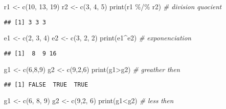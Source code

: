 \documentclass[
]{article}
\newenvironment{Shaded}{\begin{snugshade}}{\end{snugshade}}
\newcommand{\CommentTok}[1]{\textcolor[rgb]{0.56,0.35,0.01}{\textit{#1}}}
\newcommand{\DecValTok}[1]{\textcolor[rgb]{0.00,0.00,0.81}{#1}}
\newcommand{\FunctionTok}[1]{\textcolor[rgb]{0.00,0.00,0.00}{#1}}
\newcommand{\NormalTok}[1]{#1}
\newcommand{\OtherTok}[1]{\textcolor[rgb]{0.56,0.35,0.01}{#1}}
\newcommand{\SpecialCharTok}[1]{\textcolor[rgb]{0.00,0.00,0.00}{#1}}
\begin{document}
\begin{Shaded}
\begin{Highlighting}[]
\NormalTok{r1 }\OtherTok{\textless{}{-}} \FunctionTok{c}\NormalTok{(}\DecValTok{10}\NormalTok{, }\DecValTok{13}\NormalTok{, }\DecValTok{19}\NormalTok{)}
\NormalTok{r2 }\OtherTok{\textless{}{-}} \FunctionTok{c}\NormalTok{(}\DecValTok{3}\NormalTok{, }\DecValTok{4}\NormalTok{, }\DecValTok{5}\NormalTok{)}
\FunctionTok{print}\NormalTok{(r1 }\SpecialCharTok{\%/\%}\NormalTok{ r2) }\CommentTok{\# division quocient}
\end{Highlighting}
\end{Shaded}

\begin{verbatim}
## [1] 3 3 3
\end{verbatim}

\begin{Shaded}
\begin{Highlighting}[]
\NormalTok{e1 }\OtherTok{\textless{}{-}} \FunctionTok{c}\NormalTok{(}\DecValTok{2}\NormalTok{, }\DecValTok{3}\NormalTok{, }\DecValTok{4}\NormalTok{)}
\NormalTok{e2 }\OtherTok{\textless{}{-}} \FunctionTok{c}\NormalTok{(}\DecValTok{3}\NormalTok{, }\DecValTok{2}\NormalTok{, }\DecValTok{2}\NormalTok{)}
\FunctionTok{print}\NormalTok{(e1}\SpecialCharTok{\^{}}\NormalTok{e2) }\CommentTok{\# exponenciation}
\end{Highlighting}
\end{Shaded}

\begin{verbatim}
## [1]  8  9 16
\end{verbatim}

\begin{Shaded}
\begin{Highlighting}[]
\NormalTok{g1 }\OtherTok{\textless{}{-}} \FunctionTok{c}\NormalTok{(}\DecValTok{6}\NormalTok{,}\DecValTok{8}\NormalTok{,}\DecValTok{9}\NormalTok{)}
\NormalTok{g2 }\OtherTok{\textless{}{-}} \FunctionTok{c}\NormalTok{(}\DecValTok{9}\NormalTok{,}\DecValTok{2}\NormalTok{,}\DecValTok{6}\NormalTok{)}
\FunctionTok{print}\NormalTok{(g1}\SpecialCharTok{\textgreater{}}\NormalTok{g2) }\CommentTok{\# greather then}
\end{Highlighting}
\end{Shaded}

\begin{verbatim}
## [1] FALSE  TRUE  TRUE
\end{verbatim}

\begin{Shaded}
\begin{Highlighting}[]
\NormalTok{g1 }\OtherTok{\textless{}{-}} \FunctionTok{c}\NormalTok{(}\DecValTok{6}\NormalTok{, }\DecValTok{8}\NormalTok{, }\DecValTok{9}\NormalTok{)}
\NormalTok{g2 }\OtherTok{\textless{}{-}} \FunctionTok{c}\NormalTok{(}\DecValTok{9}\NormalTok{,}\DecValTok{2}\NormalTok{, }\DecValTok{6}\NormalTok{)}
\FunctionTok{print}\NormalTok{(g1}\SpecialCharTok{\textless{}}\NormalTok{g2) }\CommentTok{\# less then}
\end{Highlighting}
\end{Shaded}
\end{document}
